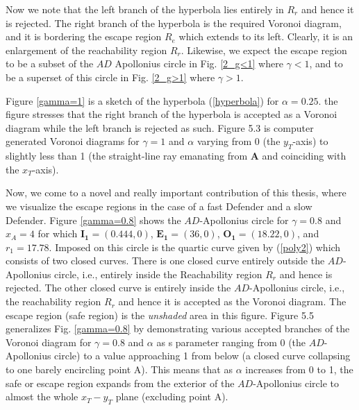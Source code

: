 Now we note that the left branch of the hyperbola lies entirely in $R_{r}$ and hence it is rejected. The right branch of the hyperbola is the required Voronoi diagram, and it is bordering the escape region $R_{e}$ which extends to its left. Clearly, it is an enlargement of the reachability region $R_{r}$. Likewise, we expect the escape region to be a subset of the $AD$ Apollonius circle in Fig. \ref{2_g<1} where $\gamma<1$, and to be a superset of this circle in Fig. \ref{2_g>1} where $\gamma>1$.   

Figure \ref{gamma=1} is a sketch of the hyperbola (\ref{hyperbola}) for $\alpha=0.25$. the figure stresses that the right branch of the hyperbola is accepted as a Voronoi diagram while the left branch is rejected as such. Figure 5.3 is computer generated Voronoi diagrams for $\gamma=1$ and $\alpha$ varying from 0 (the $y_T$-axis) to slightly less than 1 (the straight-line ray emanating from $\boldsymbol{A}$ and coinciding with the $x_T$-axis).

Now, we come to a novel and really important contribution of this thesis, where we visualize the escape regions in the case of a fast Defender and a slow Defender. Figure \ref{gamma=0.8} shows the $AD$-Apollonius circle for $\gamma=0.8$ and $x_A=4$ for which $\boldsymbol{I_1}=(0.444,0)$, $\boldsymbol{E_1}=(36,0)$, $\boldsymbol{O_1}=(18.22,0)$, and $r_1=17.78$. Imposed on this circle is the quartic curve given by (\ref{poly2}) which consists of two closed curves. There is one closed curve entirely outside the $AD$-Apollonius circle, i.e., entirely inside the Reachability region $R_r$ and hence is rejected. The other closed curve is entirely inside the $AD$-Apollonius circle, i.e., the reachability region $R_r$ and hence it is accepted as the Voronoi diagram. The escape region (safe region) is the \textit{unshaded} area in this figure. Figure 5.5 generalizes Fig. \ref{gamma=0.8} by demonstrating various accepted branches of the Voronoi diagram for $\gamma=0.8$ and $\alpha$ as s parameter ranging from 0 (the $AD$-Apollonius circle) to a value approaching 1 from below (a closed curve collapsing to one barely encircling point A). This means that as $\alpha$ increases from 0 to 1, the safe or escape region expands from the exterior of the $AD$-Apollonius circle to almost the whole $x_T-y_T$ plane (excluding point A).


